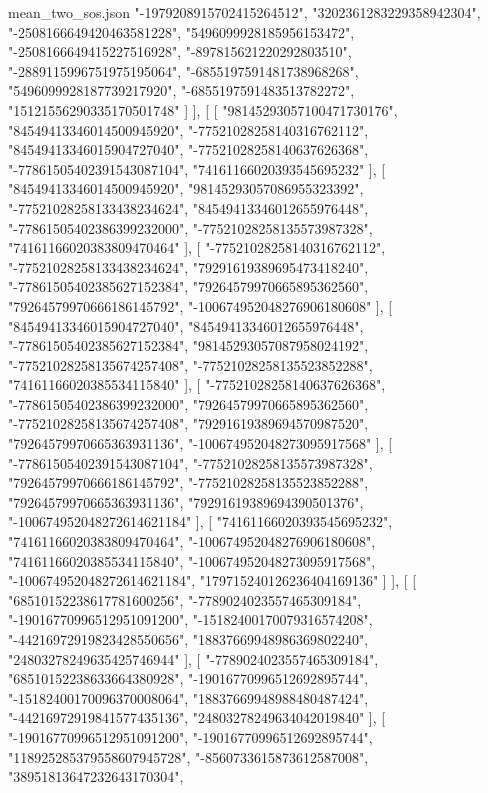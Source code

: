 \begin{filecontents*}[overwrite]{mean_two_sos.json}
    "-1979208915702415264512",
    "3202361283229358942304",
    "-2508166649420463581228",
    "5496099928185956153472",
    "-2508166649415227516928",
    "-897815621220292803510",
    "-2889115996751975195064",
    "-6855197591481738968268",
    "5496099928187739217920",
    "-6855197591483513782272",
    "15121556290335170501748"
   ]
  ],
  [
   [
    "98145293057100471730176",
    "84549413346014500945920",
    "-77521028258140316762112",
    "84549413346015904727040",
    "-77521028258140637626368",
    "-77861505402391543087104",
    "74161166020393545695232"
   ],
   [
    "84549413346014500945920",
    "98145293057086955323392",
    "-77521028258133438234624",
    "84549413346012655976448",
    "-77861505402386399232000",
    "-77521028258135573987328",
    "74161166020383809470464"
   ],
   [
    "-77521028258140316762112",
    "-77521028258133438234624",
    "79291619389695473418240",
    "-77861505402385627152384",
    "79264579970665895362560",
    "79264579970666186145792",
    "-100674952048276906180608"
   ],
   [
    "84549413346015904727040",
    "84549413346012655976448",
    "-77861505402385627152384",
    "98145293057087958024192",
    "-77521028258135674257408",
    "-77521028258135523852288",
    "74161166020385534115840"
   ],
   [
    "-77521028258140637626368",
    "-77861505402386399232000",
    "79264579970665895362560",
    "-77521028258135674257408",
    "79291619389694570987520",
    "79264579970665363931136",
    "-100674952048273095917568"
   ],
   [
    "-77861505402391543087104",
    "-77521028258135573987328",
    "79264579970666186145792",
    "-77521028258135523852288",
    "79264579970665363931136",
    "79291619389694390501376",
    "-100674952048272614621184"
   ],
   [
    "74161166020393545695232",
    "74161166020383809470464",
    "-100674952048276906180608",
    "74161166020385534115840",
    "-100674952048273095917568",
    "-100674952048272614621184",
    "179715240126236404169136"
   ]
  ],
  [
   [
    "68510152238617781600256",
    "-7789024023557465309184",
    "-19016770996512951091200",
    "-15182400170079316574208",
    "-44216972919823428550656",
    "18837669948986369802240",
    "24803278249635425746944"
   ],
   [
    "-7789024023557465309184",
    "68510152238633664380928",
    "-19016770996512692895744",
    "-15182400170096370008064",
    "18837669948988480487424",
    "-44216972919841577435136",
    "24803278249634042019840"
   ],
   [
    "-19016770996512951091200",
    "-19016770996512692895744",
    "118925285379558607945728",
    "-8560733615873612587008",
    "38951813647232643170304",

\end{filecontents*}

